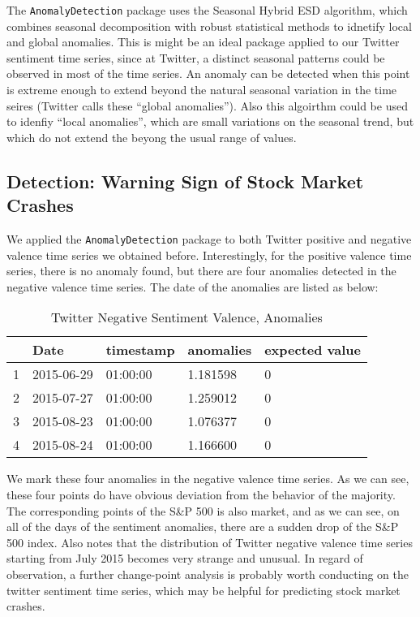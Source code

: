 \documentclass[10pt,letterpaper]{article}
\begin{document}
The \texttt{AnomalyDetection} package uses the Seasonal Hybrid ESD algorithm, which combines seasonal decomposition with robust statistical methods to idnetify local and global anomalies. This is might be an ideal package applied to our Twitter sentiment time series, since at Twitter, a distinct seasonal patterns could be observed in most of the time series. An anomaly can be detected when this point is extreme enough to extend beyond the natural seasonal variation in the time seires (Twitter calls these ``global anomalies''). Also this algoirthm could be used to idenfiy ``local anomalies'', which are small variations on the seasonal trend, but which do not extend the beyong the usual range of values. 


\subsection{Detection: Warning Sign of Stock Market Crashes}
We applied the \texttt{AnomalyDetection} package to both Twitter positive and negative valence time series we obtained before. Interestingly, for the positive valence time series, there is no anomaly found, but there are four anomalies detected in the negative valence time series. The date of the anomalies are listed as below: 


\begin{table}[!ht]
\centering
\caption{Twitter Negative Sentiment Valence, Anomalies}
\label{t1}
\begin{tabular}{l|llll}
    &Date        & timestamp     & anomalies          & expected value  \\ \hline
1   &2015-06-29  &01:00:00       &1.181598            &0                 \\
2   &2015-07-27  &01:00:00       &1.259012            &0                 \\
3   &2015-08-23  &01:00:00       &1.076377            &0                 \\
4   &2015-08-24  &01:00:00       &1.166600            &0                 \\
      
\end{tabular}
\end{table}

We mark these four anomalies in the negative valence time series. As we can see, these four points do have obvious deviation from the behavior of the majority. The corresponding points of the S\&P 500 is also market, and as we can see, on all of the days of the sentiment anomalies, there are a sudden drop of the S\&P 500 index. Also notes that the distribution of Twitter negative valence time series starting from July 2015 becomes very strange and unusual. In regard of observation, a further change-point analysis is probably worth conducting on the twitter sentiment time series, which may be helpful for predicting stock market crashes. 
\end{document}
